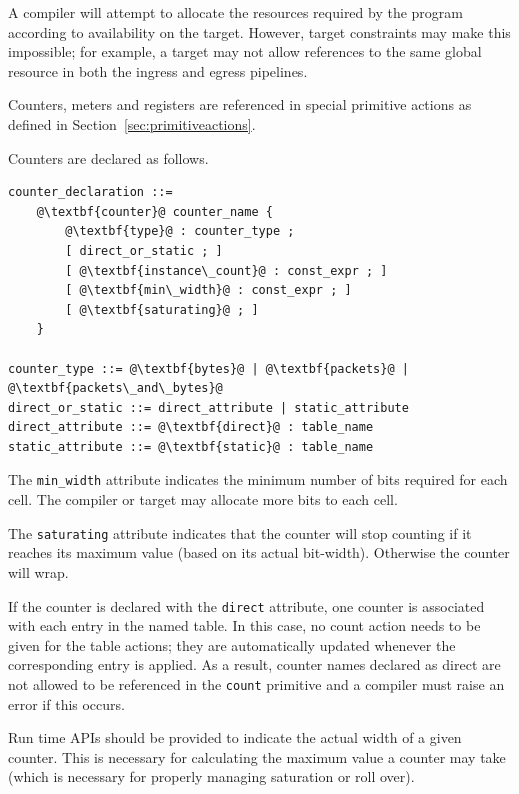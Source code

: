 \documentclass[12pt]{article}
\begin{document}
A compiler will attempt to allocate the resources required by the program 
according to availability on the target. However, target constraints may make 
this impossible; for example, a target may not allow references to the same 
global resource in both the ingress and egress pipelines.

Counters, meters and registers are referenced in special primitive actions as defined 
in Section~\ref{sec:primitiveactions}.


Counters are declared as follows.

\begin{lstlisting}[frame=single,backgroundcolor=\color{bnfgreen},escapechar=\@]
counter_declaration ::=
    @\textbf{counter}@ counter_name { 
        @\textbf{type}@ : counter_type ;
        [ direct_or_static ; ]
        [ @\textbf{instance\_count}@ : const_expr ; ]
        [ @\textbf{min\_width}@ : const_expr ; ]
        [ @\textbf{saturating}@ ; ]
    }

counter_type ::= @\textbf{bytes}@ | @\textbf{packets}@ | @\textbf{packets\_and\_bytes}@
direct_or_static ::= direct_attribute | static_attribute
direct_attribute ::= @\textbf{direct}@ : table_name
static_attribute ::= @\textbf{static}@ : table_name
\end{lstlisting}


The \texttt{min_width} attribute indicates the minimum number of bits
required for each cell.  The compiler or target may allocate more bits
to each cell.

The \texttt{saturating} attribute indicates that the counter will stop
counting if it reaches its maximum value (based on its actual
bit-width). Otherwise the counter will wrap.

If the counter is declared with the \texttt{direct} attribute, one
counter is associated with each entry in the named table. In this
case, no count action needs to be given for the table actions; they
are automatically updated whenever the corresponding entry is
applied. As a result, counter names declared as direct are not allowed
to be referenced in the \texttt{count} primitive and a compiler must
raise an error if this occurs.

Run time APIs should be provided to indicate the actual width of a
given counter.  This is necessary for calculating the maximum value a
counter may take (which is necessary for properly managing saturation
or roll over).
\end{document}
